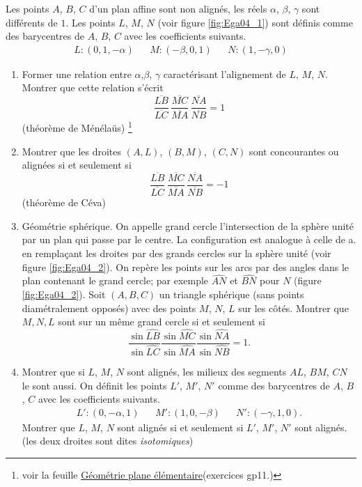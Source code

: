 Les points $A$, $B$, $C$ d'un plan affine sont non alignés, les réels $\alpha$, $\beta$, $\gamma$ sont différents de $1$. Les points $L$, $M$, $N$ (voir figure \ref{fig:Ega04_1}) sont définis comme des barycentres de $A$, $B$, $C$ avec les coefficients suivants.
\begin{align*}
 L:(0,1,-\alpha) & & M:(-\beta, 0, 1) & & N:(1,-\gamma, 0)
\end{align*}
\begin{enumerate}
 \item Former une relation entre $\alpha$,$\beta$, $\gamma$ caractérisant l'alignement de $L$, $M$, $N$. Montrer que cette relation s'écrit
\begin{displaymath}
\frac{\overline{LB}}{\overline{LC}}\,
\frac{\overline{MC}}{\overline{MA}}\,
\frac{\overline{NA}}{\overline{NB}}=1 
\end{displaymath}
(théorème de Ménélaüs)
\footnote{voir la feuille \href{http://back.maquisdoc.net/data/temptex/fexgp.pdf}{Géométrie plane élémentaire}(exercices gp11.)}
\item Montrer que les droites $(A,L)$, $(B,M)$, $(C,N)$ sont concourantes ou alignées si et seulement si 
\begin{displaymath}
\frac{\overline{LB}}{\overline{LC}}\,
\frac{\overline{MC}}{\overline{MA}}\,
\frac{\overline{NA}}{\overline{NB}}=-1 
\end{displaymath}
(théorème de Céva)

\item Géométrie sphérique.\newline
 On appelle grand cercle l'intersection de la sphère unité par un plan qui passe par le centre. La configuration est analogue à celle de a. en remplaçant les droites par des grands cercles sur la sphère unité (voir figure \ref{fig:Ega04_2}). \newline
 On repère les points sur les arcs par des angles dans le plan contenant le grand cercle; par exemple $\widehat{AN}$ et $\widehat{BN}$ pour $N$ (figure \ref{fig:Ega04_2}).\newline
 Soit $(A,B,C)$ un triangle sphérique (sans points diamétralement opposés) avec des points $M$, $N$, $L$ sur les côtés. Montrer que $M, N, L$ sont sur un même grand cercle si et seulement si
 \begin{displaymath}
   \frac{\sin \widehat{LB}}{\sin \widehat{LC}}
   \frac{\sin \widehat{MC}}{\sin \widehat{MA}}
   \frac{\sin \widehat{NA}}{\sin \widehat{NB}}
= 1.
\end{displaymath}


\item Montrer que si $L$, $M$, $N$ sont alignés, les milieux des segments $AL$, $BM$, $CN$ le sont aussi.\newline
On définit les points $L'$, $M'$, $N'$ comme des barycentres de $A$, $B$, $C$ avec les coefficients suivants.
\begin{align*}
 L':(0,-\alpha,1) & & M':(1, 0, -\beta) & & N':(-\gamma, 1, 0).
\end{align*}
Montrer que $L$, $M$, $N$ sont alignés si et seulement si $L'$, $M'$, $N'$ sont alignés. (les deux droites sont dites \emph{isotomiques})
\end{enumerate}

